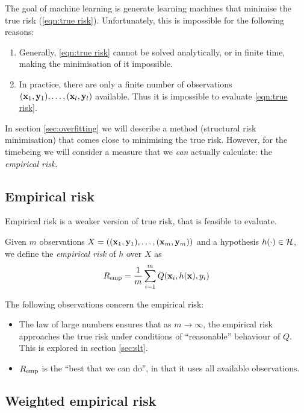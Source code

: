 The goal of machine learning is generate learning machines that
minimise the true risk (\ref{eqn:true risk}).  Unfortunately, this is
impossible for the following reasons:
%
\begin{enumerate}
\item	Generally, \ref{eqn:true risk} cannot be solved analytically,
	or in finite time, making the minimisation of it impossible.
%
\item	In practice, there are only a finite number of observations
	$(\mathbf{x}_1, \mathbf{y}_1), \ldots, (\mathbf{x}_l, \mathbf{y}_l)$ available.  Thus
	it is impossible to evaluate \ref{eqn:true risk}.
\end{enumerate}
%
In section \ref{sec:overfitting} we will describe a method (structural
risk minimisation) that comes close to minimising the true risk.
However, for the timebeing we will consider a measure that we
\emph{can} actually calculate: the \emph{empirical risk}.


\subsection{Empirical risk}
\label{sec:empirical risk}
Empirical risk is a weaker version of true risk, that is feasible to
evaluate.

\begin{definition}
Given $m$ observations $X = ((\mathbf{x}_1, \mathbf{y}_1), \ldots, (\mathbf{x}_m,
\mathbf{y}_m))$ and a hypothesis $h(\cdot) \in \mathcal{H}$, we define the
\emph{empirical risk} of $h$ over $X$ as 
%
\begin{equation}
R_{\mathrm{emp}} = \frac{1}{m} \sum_{i=1}^{m} Q(\mathbf{x}_i, h(\mathbf{x}), y_i)
\end{equation}
\end{definition}

The following observations concern the empirical risk:
%
\begin{itemize}
\item 	The law of large numbers ensures that as $m \rightarrow
	\infty$, the empirical risk approaches the true risk under
	conditions of ``reasonable'' behaviour of $Q$.  This is
	explored in section \ref{sec:slt}.
\item	$R_{\mathrm{emp}}$ is the ``best that we can do'', in that it uses all
	available observations.
\end{itemize}


\subsection{Weighted empirical risk}
\label{sec:weighted empirical risk}

